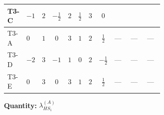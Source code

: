 \documentclass[8pt]{article}
\begin{document}
\begin{landscape}
\begin{longtable}{@{}llcccccc >{\raggedright\arraybackslash}p{0.21\linewidth} >{\raggedright\arraybackslash}p{0.21\linewidth} >{\raggedright\arraybackslash}p{0.21\linewidth}@{}}
\midrule
T3-C & $-1$ & $2$ & $-\frac{1}{2}$ & $2$ & $\frac{1}{2}$ & $3$ & $0$ & \scriptsize\adjustbox{max width=\linewidth}{$\begin{gathered} {\lambda_{HS_1}^{(A)}} (6 \operatorname{Tr}\!\left({Y_d}\,\left({Y_d}\right)^{\dagger}\right)+2 \operatorname{Tr}\!\left({Y_e}\,\left({Y_e}\right)^{\dagger}\right)+6 \operatorname{Tr}\!\left({Y_u}\,\left({Y_u}\right)^{\dagger}\right))\end{gathered}$} & \scriptsize\adjustbox{max width=\linewidth}{$\begin{gathered} +\frac{64}{3} {\lambda_7} \left({\lambda_7}\right)^{*}\end{gathered}$} & \scriptsize\adjustbox{max width=\linewidth}{$\begin{gathered} -\frac{4}{3} {\lambda_{11}} \left({\lambda_{H H^\dagger S_1^\dagger S_2^\dagger}^{\rm Cross}}\right)^{*}\end{gathered}$} \\
\midrule
T3-A & $0$ & $1$ & $0$ & $3$ & $1$ & $2$ & $\frac{1}{2}$ & --- & --- & --- \\
\midrule
T3-D & $-2$ & $3$ & $-1$ & $1$ & $0$ & $2$ & $-\frac{1}{2}$ & --- & --- & --- \\
\midrule
T3-E & $0$ & $3$ & $0$ & $3$ & $1$ & $2$ & $\frac{1}{2}$ & --- & --- & --- \\
\midrule
\bottomrule
\end{longtable}
\clearpage
\noindent\textbf{Quantity: }$\lambda_{HS_1}^{(A)}$\par\smallskip

\end{landscape}
\end{document}
